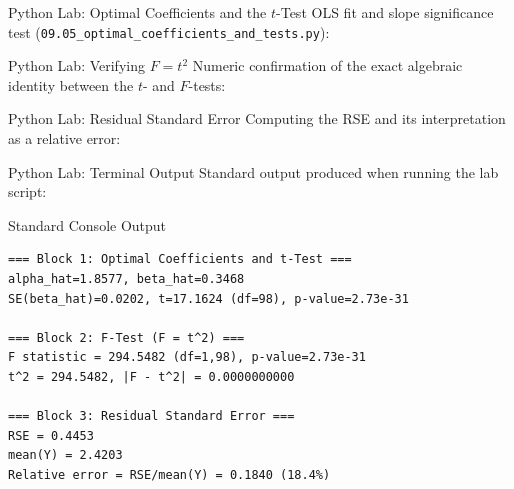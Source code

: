 \documentclass[10pt, aspectratio=169]{beamer}
\begin{document}
\begin{frame}[fragile]{Python Lab: Optimal Coefficients and the $t$-Test}
  \scriptsize
  OLS fit and slope significance test (\texttt{09.05\_optimal\_coefficients\_and\_tests.py}):
  {
  }
\end{frame}

\begin{frame}[fragile]{Python Lab: Verifying $F=t^2$}
  \scriptsize
  Numeric confirmation of the exact algebraic identity between the $t$- and $F$-tests:
  {
  }
\end{frame}

\begin{frame}[fragile]{Python Lab: Residual Standard Error}
  \scriptsize
  Computing the RSE and its interpretation as a relative error:
  {
  }
\end{frame}

\begin{frame}[fragile]{Python Lab: Terminal Output}
  \scriptsize
  Standard output produced when running the lab script:
  \vspace{0.02cm}
  \begin{block}{Standard Console Output}
    \fontsize{3.6pt}{4.3pt}\selectfont
    \begin{verbatim}
=== Block 1: Optimal Coefficients and t-Test ===
alpha_hat=1.8577, beta_hat=0.3468
SE(beta_hat)=0.0202, t=17.1624 (df=98), p-value=2.73e-31

=== Block 2: F-Test (F = t^2) ===
F statistic = 294.5482 (df=1,98), p-value=2.73e-31
t^2 = 294.5482, |F - t^2| = 0.0000000000

=== Block 3: Residual Standard Error ===
RSE = 0.4453
mean(Y) = 2.4203
Relative error = RSE/mean(Y) = 0.1840 (18.4%)
    \end{verbatim}
  \end{block}
\end{frame}
\end{document}

